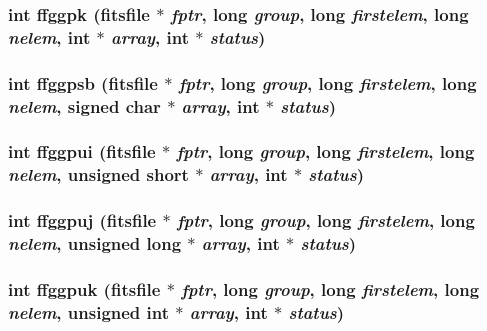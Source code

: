 \subsubsection{\setlength{\rightskip}{0pt plus 5cm}int ffggpk (\bf{fitsfile} $\ast$ {\em fptr}, long {\em group}, long {\em firstelem}, long {\em nelem}, int $\ast$ {\em array}, int $\ast$ {\em status})}\label{fitsio__64_8h_09f7024b2b7c61b65c69753195f596e2}


\subsubsection{\setlength{\rightskip}{0pt plus 5cm}int ffggpsb (\bf{fitsfile} $\ast$ {\em fptr}, long {\em group}, long {\em firstelem}, long {\em nelem}, signed char $\ast$ {\em array}, int $\ast$ {\em status})}\label{fitsio__64_8h_be4013a55c9a0fc0e0c4bb9708709d9a}


\subsubsection{\setlength{\rightskip}{0pt plus 5cm}int ffggpui (\bf{fitsfile} $\ast$ {\em fptr}, long {\em group}, long {\em firstelem}, long {\em nelem}, unsigned short $\ast$ {\em array}, int $\ast$ {\em status})}\label{fitsio__64_8h_34d6ece27ce372694fbd813123a5e5be}


\subsubsection{\setlength{\rightskip}{0pt plus 5cm}int ffggpuj (\bf{fitsfile} $\ast$ {\em fptr}, long {\em group}, long {\em firstelem}, long {\em nelem}, unsigned long $\ast$ {\em array}, int $\ast$ {\em status})}\label{fitsio__64_8h_895a8758518346c4e79ba31731f2a726}


\subsubsection{\setlength{\rightskip}{0pt plus 5cm}int ffggpuk (\bf{fitsfile} $\ast$ {\em fptr}, long {\em group}, long {\em firstelem}, long {\em nelem}, unsigned int $\ast$ {\em array}, int $\ast$ {\em status})}\label{fitsio__64_8h_2903d7086c8c109b98b9626067b45c11}


